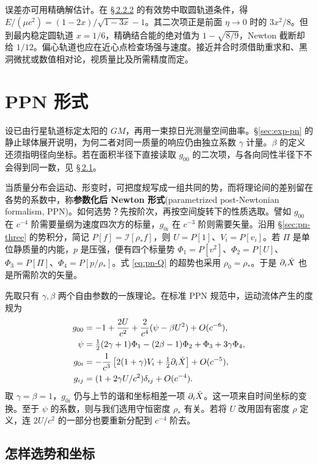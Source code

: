 误差亦可用精确解估计。在 \hyperlink{subsection.2.2.2}{\S\,2.2.2} 的有效势中取圆轨道条件，得 $E/(\mu c^2)=(1-2x)/\sqrt{1-3x}-1$。其二次项正是前面 $\eta\to0$ 时的 $3x^2/8$。但到最内稳定圆轨道 $x=1/6$，精确结合能的绝对值为 $1-\sqrt{8/9}$，Newton 截断却给 $1/12$。偏心轨道也应在近心点检查场强与速度。接近并合时须借助重求和、黑洞微扰或数值相对论，视质量比及所需精度而定。

\section{PPN 形式}\label{sec:exp-ppn}

设已由行星轨道标定太阳的 $GM$，再用一束掠日光测量空间曲率。\S\ref{sec:exp-pn} 的静止球体展开说明，为何二者对同一质量的响应仍由独立系数 $\gamma$ 计量。$\beta$ 的定义还须指明径向坐标。若在面积半径下直接读取 $g_{00}$ 的二次项，与各向同性半径下不会得到同一数，见 \hyperlink{section.2.1}{\S\,2.1}。

当质量分布会运动、形变时，可把度规写成一组共同的势，而将理论间的差别留在各势的系数中，称\textbf{参数化后 Newton 形式}(parametrized post-Newtonian formalism, PPN)。如何选势？先按阶次，再按空间旋转下的性质选取。譬如 $g_{00}$ 在 $c^{-4}$ 阶需要量纲为速度四次方的标量，$g_{0i}$ 在 $c^{-3}$ 阶则需要矢量。沿用 \S\ref{sec:pn-three} 的势积分，简记 $P[f]=\mathcal I[\rho_* f]$，则 $U=P[1]$、$V_i=P[v_i]$。若 $\Pi$ 是单位静质量的内能，$p$ 是压强，便有四个标量势 $\Phi_1=P[v^2]$、$\Phi_2=P[U]$、$\Phi_3=P[\Pi]$、$\Phi_4=P[p/\rho_*]$。式 \eqref{eq:pn-Q} 的超势也采用 $\rho_0=\rho_*$。于是 $\partial_i\dot X$ 也是所需阶次的矢量。

先取只有 $\gamma,\beta$ 两个自由参数的一族理论。在标准 PPN 规范中，运动流体产生的度规为
\begin{align*}
 g_{00}&=-1+\frac{2U}{c^2}+\frac{2}{c^4}(\psi-\beta U^2)+O(c^{-6}),\\
 \psi&=\tfrac12(2\gamma+1)\Phi_1-(2\beta-1)\Phi_2+\Phi_3+3\gamma\Phi_4,\\
 g_{0i}&=-\frac{1}{c^3}\left[2(1+\gamma)V_i+\tfrac12\partial_i\dot X\right]+O(c^{-5}),\\
 g_{ij}&=(1+2\gamma U/c^2)\delta_{ij}+O(c^{-4}).
\end{align*}
取 $\gamma=\beta=1$，$g_{0i}$ 仍与上节的谐和坐标相差一项 $\partial_i\dot X$。这一项来自时间坐标的变换。至于 $\psi$ 的系数，则与我们选用守恒密度 $\rho_*$ 有关。若将 $U$ 改用固有密度 $\rho$ 定义，连 $2U/c^2$ 的一部分也要重新分配到 $c^{-4}$ 阶去。

\subsection{怎样选势和坐标}

